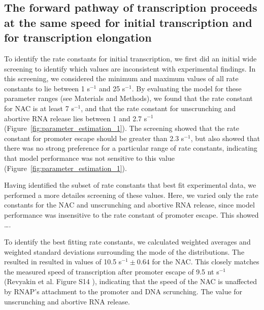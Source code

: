 %
\subsection{The forward pathway of transcription proceeds at the same speed
for initial transcription and for transcription elongation}

To identify the rate constants for initial transcription, we first did an
initial wide screening to identify which values are inconsistent with experimental
findings. In this screening, we considered the minimum and maximum values of
all rate constants to lie between 1 s$^{-1}$ and 25 s$^{-1}$. By evaluating
the model for these parameter ranges (see Materials and Methods), we found
that the rate constant for NAC is at least 7 s$^{-1}$, and that the rate
constant for unscrunching and abortive RNA release lies between 1 and 2.7
s$^{-1}$ (Figure~\ref{fig:parameter_estimation_1}). The screening showed that
the rate constant for promoter escape should be greater than 2.3 s$^{-1}$, but
also showed that there was no strong preference for a particular range of
rate constants, indicating that model performance was not sensitive to this
value (Figure~\ref{fig:parameter_estimation_1}).

Having identified the subset of rate constants that best fit experimental
data, we performed a more detailes screening of these values. Here, we varied
only the rate constants for the NAC and unscrunching and abortive RNA release,
since model performance was insensitive to the rate constant of promoter
escape. This showed \ldots.

To identify the best fitting rate constants, we calculated weighted averages
and weighted standard deviations surrounding the mode of the distributions.
The resulted in resulted in values of 10.5 s$^{-1} \pm 0.64$ for the NAC. This
closely matches the measured speed of transcription after promoter escape of
9.5 nt s$^{-1}$ (Revyakin et al. Figure S14 \cite{revyakin_abortive_2006}),
indicating that the speed of the NAC is unaffected by RNAP's attachment to the
promoter and DNA scrunching. The value for unscrunching and abortive RNA
release.



